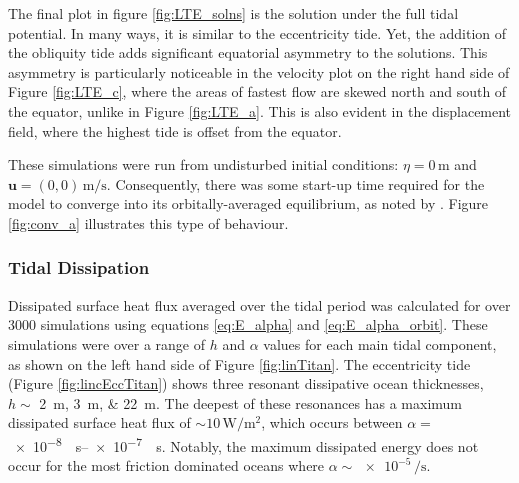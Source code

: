 The final plot in figure \ref{fig:LTE_solns} is the solution under the full tidal potential. In many ways, it is similar to the eccentricity tide. Yet, the addition of the obliquity tide adds significant equatorial asymmetry to the solutions. This asymmetry is particularly noticeable in the velocity plot on the right hand side of Figure \ref{fig:LTE_c}, where the areas of fastest flow are skewed north and south of the equator, unlike in Figure \ref{fig:LTE_a}. This is also evident in the displacement field, where the highest tide is offset from the equator.

These simulations were run from undisturbed initial conditions: \hbox{$\eta = 0 \, \si{\metre}$} and \hbox{$\bm{u} = (0,0) \, \si{\metre\per\second}$}. Consequently, there was some start-up time required for the model to converge into its orbitally-averaged equilibrium, as noted by \citet{sears1995tidal}. Figure \ref{fig:conv_a} illustrates this type of behaviour.



\subsubsection{Tidal Dissipation \label{subsubsec:linTitan}}

Dissipated surface heat flux averaged over the tidal period was calculated for over 3000 simulations using equations \ref{eq:E_alpha} and \ref{eq:E_alpha_orbit}. These simulations were over a range of $h$ and $\alpha$ values for each main tidal component, as shown on the left hand side of Figure \ref{fig:linTitan}. The eccentricity tide (Figure \ref{fig:lincEccTitan}) shows three resonant dissipative ocean thicknesses, $h \sim$ \SIlist{2;3;22}{\metre}. The deepest of these resonances has a maximum dissipated surface heat flux of $\sim 10\, \si{\watt\per\square\metre}$, which occurs between $\alpha =$ \SIrange{e-8}{e-7}{\per\second}. Notably, the maximum dissipated energy does not occur for the most friction dominated oceans where $\alpha \sim \num{e-5} \, \si{\per\second}$.

